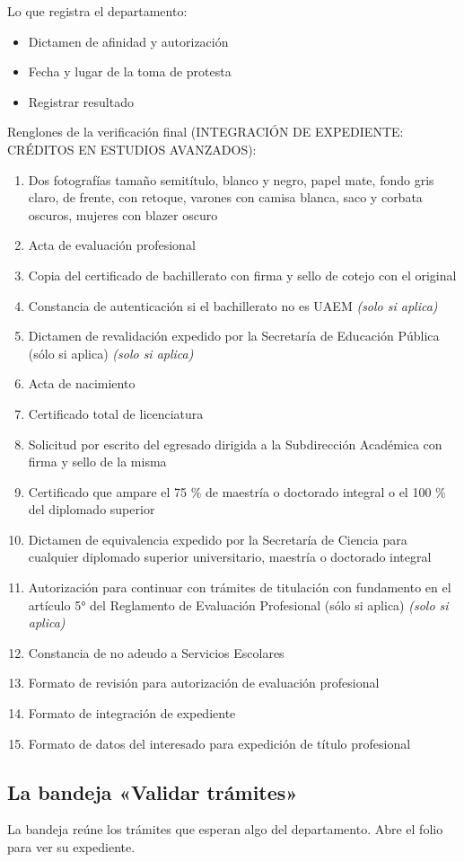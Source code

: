 Lo que registra el departamento:
\begin{itemize}
  \item Dictamen de afinidad y autorización
  \item Fecha y lugar de la toma de protesta
  \item Registrar resultado
\end{itemize}
Renglones de la verificación final (INTEGRACIÓN DE EXPEDIENTE: CRÉDITOS EN ESTUDIOS AVANZADOS):
\begin{enumerate}
  \item Dos fotografías tamaño semitítulo, blanco y negro, papel mate, fondo gris claro, de frente, con retoque, varones con camisa blanca, saco y corbata oscuros, mujeres con blazer oscuro
  \item Acta de evaluación profesional
  \item Copia del certificado de bachillerato con firma y sello de cotejo con el original
  \item Constancia de autenticación si el bachillerato no es UAEM \emph{(solo si aplica)}
  \item Dictamen de revalidación expedido por la Secretaría de Educación Pública (sólo si aplica) \emph{(solo si aplica)}
  \item Acta de nacimiento
  \item Certificado total de licenciatura
  \item Solicitud por escrito del egresado dirigida a la Subdirección Académica con firma y sello de la misma
  \item Certificado que ampare el 75 \% de maestría o doctorado integral o el 100 \% del diplomado superior
  \item Dictamen de equivalencia expedido por la Secretaría de Ciencia para cualquier diplomado superior universitario, maestría o doctorado integral
  \item Autorización para continuar con trámites de titulación con fundamento en el artículo 5° del Reglamento de Evaluación Profesional (sólo si aplica) \emph{(solo si aplica)}
  \item Constancia de no adeudo a Servicios Escolares
  \item Formato de revisión para autorización de evaluación profesional
  \item Formato de integración de expediente
  \item Formato de datos del interesado para expedición de título profesional
\end{enumerate}
\subsection{La bandeja «Validar trámites»}
La bandeja reúne los trámites que esperan algo del departamento. Abre el folio para ver su expediente.
